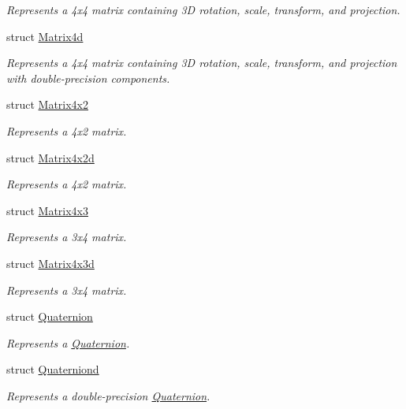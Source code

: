 \begin{DoxyCompactItemize}
\begin{DoxyCompactList}\small\item\em Represents a 4x4 matrix containing 3\-D rotation, scale, transform, and projection. \end{DoxyCompactList}\item 
struct \hyperlink{struct_open_t_k_1_1_matrix4d}{Matrix4d}
\begin{DoxyCompactList}\small\item\em Represents a 4x4 matrix containing 3\-D rotation, scale, transform, and projection with double-\/precision components. \end{DoxyCompactList}\item 
struct \hyperlink{struct_open_t_k_1_1_matrix4x2}{Matrix4x2}
\begin{DoxyCompactList}\small\item\em Represents a 4x2 matrix. \end{DoxyCompactList}\item 
struct \hyperlink{struct_open_t_k_1_1_matrix4x2d}{Matrix4x2d}
\begin{DoxyCompactList}\small\item\em Represents a 4x2 matrix. \end{DoxyCompactList}\item 
struct \hyperlink{struct_open_t_k_1_1_matrix4x3}{Matrix4x3}
\begin{DoxyCompactList}\small\item\em Represents a 3x4 matrix. \end{DoxyCompactList}\item 
struct \hyperlink{struct_open_t_k_1_1_matrix4x3d}{Matrix4x3d}
\begin{DoxyCompactList}\small\item\em Represents a 3x4 matrix. \end{DoxyCompactList}\item 
struct \hyperlink{struct_open_t_k_1_1_quaternion}{Quaternion}
\begin{DoxyCompactList}\small\item\em Represents a \hyperlink{struct_open_t_k_1_1_quaternion}{Quaternion}. \end{DoxyCompactList}\item 
struct \hyperlink{struct_open_t_k_1_1_quaterniond}{Quaterniond}
\begin{DoxyCompactList}\small\item\em Represents a double-\/precision \hyperlink{struct_open_t_k_1_1_quaternion}{Quaternion}. \end{DoxyCompactList}\item 

\end{DoxyCompactItemize}

